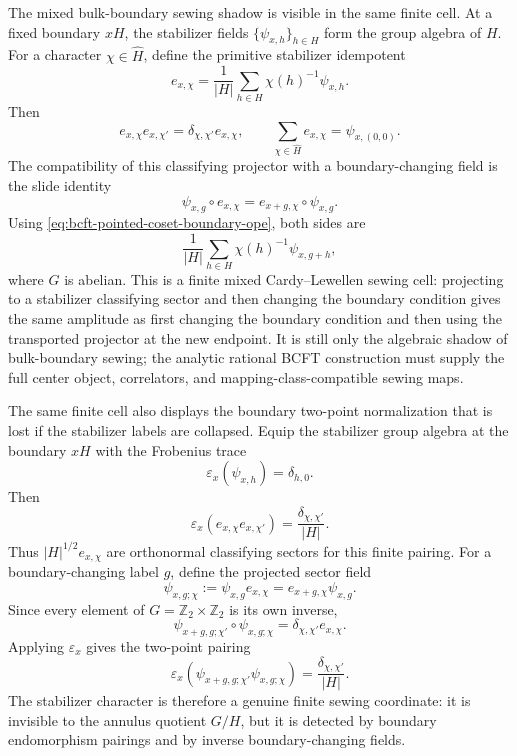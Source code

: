 The mixed bulk-boundary sewing shadow is visible in the same finite cell.
At a fixed boundary \(xH\), the stabilizer fields
\(\{\psi_{x,h}\}_{h\in H}\) form the group algebra of \(H\).  For a character
\(\chi\in\widehat H\), define the primitive stabilizer idempotent
\begin{equation}
  e_{x,\chi}
  =
  \frac1{|H|}
  \sum_{h\in H}\chi(h)^{-1}\psi_{x,h}.
  \label{eq:bcft-pointed-stabilizer-idempotent}
\end{equation}
Then
\begin{equation}
  e_{x,\chi}e_{x,\chi'}
  =
  \delta_{\chi,\chi'}e_{x,\chi},
  \qquad
  \sum_{\chi\in\widehat H}e_{x,\chi}=\psi_{x,(0,0)} .
  \label{eq:bcft-pointed-stabilizer-idempotent-algebra}
\end{equation}
The compatibility of this classifying projector with a boundary-changing
field is the slide identity
\begin{equation}
  \psi_{x,g}\circ e_{x,\chi}
  =
  e_{x+g,\chi}\circ\psi_{x,g}.
  \label{eq:bcft-pointed-bulk-boundary-slide}
\end{equation}
Using \eqref{eq:bcft-pointed-coset-boundary-ope}, both sides are
\[
  \frac1{|H|}\sum_{h\in H}\chi(h)^{-1}\psi_{x,g+h},
\]
where \(G\) is abelian.  This is a finite mixed Cardy--Lewellen sewing cell:
projecting to a stabilizer classifying sector and then changing the boundary
condition gives the same amplitude as first changing the boundary condition
and then using the transported projector at the new endpoint.  It is still
only the algebraic shadow of bulk-boundary sewing; the analytic rational
BCFT construction must supply the full center object, correlators, and
mapping-class-compatible sewing maps.

The same finite cell also displays the boundary two-point normalization that
is lost if the stabilizer labels are collapsed.  Equip the stabilizer group
algebra at the boundary \(xH\) with the Frobenius trace
\[
  \varepsilon_x(\psi_{x,h})=\delta_{h,0}.
\]
Then
\begin{equation}
  \varepsilon_x(e_{x,\chi}e_{x,\chi'})
  =
  \frac{\delta_{\chi,\chi'}}{|H|}.
  \label{eq:bcft-pointed-stabilizer-two-point-pairing}
\end{equation}
Thus \(|H|^{1/2}e_{x,\chi}\) are orthonormal classifying sectors for this
finite pairing.  For a boundary-changing label \(g\), define the projected
sector field
\[
  \psi_{x,g;\chi}:=\psi_{x,g}e_{x,\chi}
  =
  e_{x+g,\chi}\psi_{x,g}.
\]
Since every element of \(G=\mathbb Z_2\times\mathbb Z_2\) is its own inverse,
\begin{equation}
  \psi_{x+g,g;\chi'}\circ\psi_{x,g;\chi}
  =
  \delta_{\chi,\chi'}e_{x,\chi}.
  \label{eq:bcft-pointed-stabilizer-sector-inverse}
\end{equation}
Applying \(\varepsilon_x\) gives the two-point pairing
\[
  \varepsilon_x(
    \psi_{x+g,g;\chi'}\psi_{x,g;\chi}
  )
  =
  \frac{\delta_{\chi,\chi'}}{|H|}.
\]
The stabilizer character is therefore a genuine finite sewing coordinate:
it is invisible to the annulus quotient \(G/H\), but it is detected by
boundary endomorphism pairings and by inverse boundary-changing fields.

